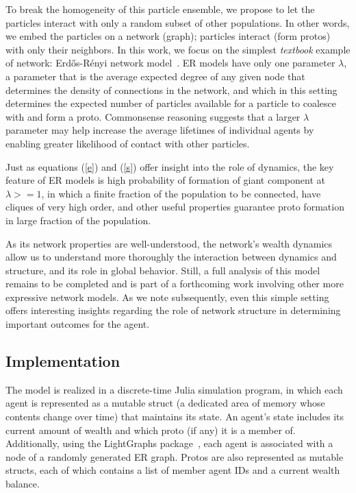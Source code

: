 To break the homogeneity of this particle ensemble, we propose to let the particles interact with only a random subset of other populations. In other words, we embed the particles on a network (graph); particles interact (form protos) with only their neighbors. In this work, we focus on the simplest \textit{textbook} example of network: Erd\H{o}s-R\'{e}nyi network model~\cite{newman2018networks}. ER models have only one parameter $\lambda$, a parameter that is the average expected degree of any given node that determines the density of connections in the network, and which in this setting determines the expected number of particles available for a particle to coalesce with and form a proto. Commonsense reasoning suggests that a larger $\lambda$ parameter may help increase the average lifetimes of individual agents by enabling greater likelihood of contact with other particles. 

Just as equations (\ref{e}) and (\ref{s}) offer insight into the role of dynamics, the key feature of ER models is high probability of formation of giant component at $\lambda>=1$, in which a finite fraction of the population to be connected, have cliques of very high order, and other useful properties guarantee proto formation in large fraction of the population.  

As its network properties are well-understood, the network's wealth dynamics allow us to understand more thoroughly the interaction between dynamics and structure, and its role in global behavior. Still, a full analysis of this model remains to be completed and is part of a forthcoming work involving other more expressive network models. As we note subsequently, even this simple setting offers interesting insights regarding the role of network structure in determining important outcomes for the agent. 


\subsection{Implementation}


The model is realized in a discrete-time Julia simulation program, in which each agent is represented as a mutable struct (a dedicated area of memory whose contents change over time) that maintains its state. An agent's state includes its current amount of wealth and which proto (if any) it is a member of. Additionally, using the LightGraphs package~\cite{LightGraphs-2017}, each agent is associated with a node of a randomly generated ER graph. Protos are also represented as mutable structs, each of which contains a list of member agent IDs and a current wealth balance.

